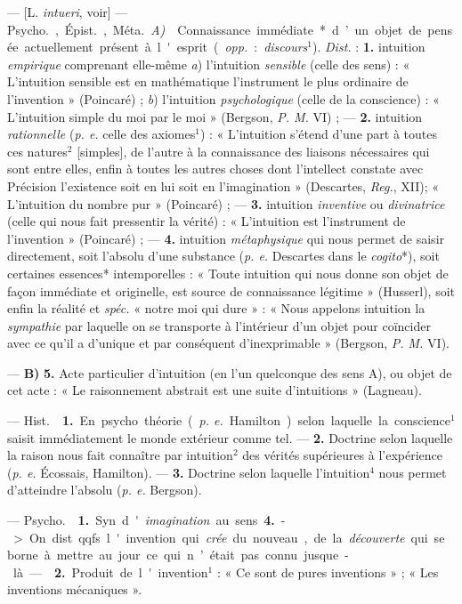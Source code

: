 \begin{itemize}[leftmargin=1cm, label=, itemsep=1pt]
 — [L. {\it intueri}, voir] — \si{Psycho.}, \si{Épist.},
\si{Méta.} {\it A)}  Connaissance immédiate* d’un objet de
pensée actuellement présent à l'esprit ({\it opp.} : {\it discours}$^1$).
{\it Dist.} : {\bf 1.} intuition {\it empirique} comprenant elle-même
{\it a}) l'intuition {\it sensible} (celle des sens) : « L'intuition sensible
est en mathématique l'instrument le plus ordinaire de
l'invention » (Poincaré) ; {\it b}) l'intuition {\it psychologique} (celle de
la conscience) : « L’intuition simple du moi par le moi » (Bergson, {\it P.
M.} VI) ; — {\bf 2.} intuition {\it rationnelle} ({\it p. e.} celle des
axiomes$^1$) : « L’intuition s'étend d'une part à toutes ces natures$^2$
[simples], de l’autre à la connaissance des liaisons nécessaires qui sont
entre elles, enfin à toutes les autres choses dont l’intellect constate avec
Précision l'existence soit en lui soit en l'imagination » (Descartes,
{\it Reg.}, XII); « L’intuition du nombre pur » (Poincaré) ; —  {\bf 3.}
intuition {\it inventive} ou {\it divinatrice} (celle qui nous fait
pressentir la vérité) : « L’intuition est l’instrument de
l'invention » (Poincaré) ; —  {\bf 4.} intuition {\it métaphysique} qui nous
permet de saisir directement, soit l'absolu d’une substance ({\it p. e.}
Descartes dans le {\it cogito}*), soit certaines essences* intemporelles :
« Toute intuition qui nous donne son objet
de façon immédiate et originelle, est source de connaissance légitime »
(Husserl), soit enfin la réalité et {\it spéc.} « notre moi qui dure » :
« Nous appelons intuition la {\it sympathie} par laquelle on se transporte à
l’intérieur d’un objet pour coïncider avec ce qu'il a d’unique et par
conséquent d’inexprimable » (Bergson, {\it P. M.} VI).

— {\bf B)}  {\bf 5.} Acte particulier d’intuition (en l’un
quelconque des sens A), ou objet de cet acte : « Le raisonnement abstrait est
une suite d’intuitions » (Lagneau).

 — \si{Hist.}  {\bf 1.} En psycho. théorie
({\it p. e.} Hamilton) selon laquelle la conscience$^1$ saisit immédiatement
le monde extérieur comme tel. —  {\bf 2.} Doctrine selon laquelle la raison
nous fait connaître par intuition$^2$ des vérités supérieures à l’expérience
({\it p. e.} Écossais, Hamilton). —  {\bf 3.} Doctrine selon laquelle
l'intuition$^4$ nous permet d'atteindre l'absolu ({\it p. e.} Bergson).

 — \si{Psycho.}  {\bf 1.} Syn.
d'{\it imagination} au sens {\bf 4.} -> On dist. qqfs. l'invention qui
{\it crée} du nouveau, de la {\it découverte} qui se borne à mettre au jour
ce qui n’était pas connu jusque-là. —  {\bf 2.} Produit de
l'invention$^1$ : « Ce sont de pures inventions » ; « Les inventions
mécaniques ».


\end{itemize}
